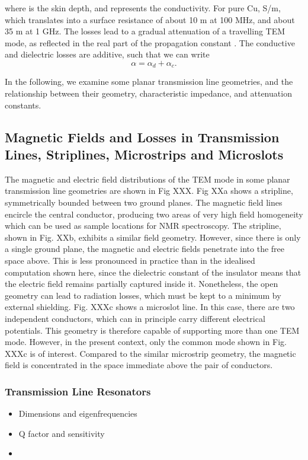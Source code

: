 %
where  is the skin depth, and \m{\sigma} represents the
conductivity. For pure Cu, S/m, which translates
into a surface resistance of about 10 m\m{\Omega} at 100 MHz, and about
35 m\m{\Omega} at 1 GHz. The losses lead to a gradual attenuation of a
travelling TEM mode, as reflected in the real part of the propagation
constant \m{\gamma}. The conductive and dielectric losses are additive,
such that we can write
%
\begin{equation}
\alpha = \alpha_d + \alpha_c.
\end{equation}

In the following, we examine some planar transmission line geometries,
and the relationship between their geometry, characteristic impedance,
and attenuation constants.

\subsection{Magnetic Fields and Losses in Transmission Lines,
Striplines, Microstrips and
Microslots}

The magnetic and electric field distributions of the TEM mode in some
planar transmission line geometries are shown in Fig XXX. Fig XXa shows
a stripline, symmetrically bounded between two ground planes. The
magnetic field lines encircle the central conductor, producing two areas
of very high field homogeneity which can be used as sample locations for
NMR spectroscopy. The stripline, shown in Fig. XXb, exhibits a similar
field geometry. However, since there is only a single ground plane, the
magnetic and electric fields penetrate into the free space above. This
is less pronounced in practice than in the idealised computation shown
here, since the dielectric constant of the insulator means that the
electric field remains partially captured inside it. Nonetheless, the
open geometry can lead to radiation losses, which must be kept to a
minimum by external shielding. Fig. XXXc shows a microslot line. In this
case, there are two independent conductors, which can in principle carry
different electrical potentials. This geometry is therefore capable of
supporting more than one TEM mode. However, in the present context, only
the common mode shown in Fig. XXXc is of interest. Compared to the
similar microstrip geometry, the magnetic field is concentrated in the
space immediate above the pair of conductors.

\subsubsection{Transmission Line
Resonators}\label{transmission-line-resonators}

\begin{itemize}
\item
  Dimensions and eigenfrequencies
\item
  Q factor and sensitivity
\item
\end{itemize}
